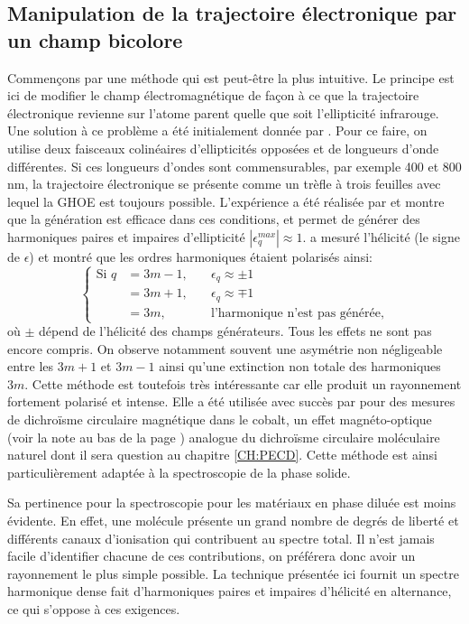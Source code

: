 \subsection{Manipulation de la trajectoire électronique par un champ bicolore}
Commençons par une méthode qui est peut-être la plus intuitive. Le principe est ici de modifier le champ électromagnétique de façon à ce que la trajectoire électronique revienne sur l'atome parent quelle que soit l'ellipticité infrarouge. Une solution à ce problème a été initialement donnée par . Pour ce faire, on utilise deux faisceaux colinéaires d’ellipticités opposées et de longueurs d'onde différentes. Si ces longueurs d'ondes sont commensurables, par exemple 400 et 800 nm, la trajectoire électronique se présente comme un trèfle à trois feuilles avec lequel la GHOE est toujours possible. L'expérience a été réalisée par  et montre que la génération est efficace dans ces conditions, et permet de générer des harmoniques paires et impaires d'ellipticité $|\epsilon^{max}_q|\approx 1$.  a mesuré l'hélicité (le signe de $\epsilon$) et montré que les ordres harmoniques étaient polarisés ainsi:
\begin{equation}
\left\{
\begin{aligned}
  \text{Si }q&=3m-1,\quad &\epsilon_q \approx \pm 1 \\
	&=3m+1, &\epsilon_q \approx \mp 1 \\
	&=3m, &\text{l'harmonique n'est pas générée},
\end{aligned}
\right.
\end{equation}
où $\pm$ dépend de l'hélicité des champs générateurs. Tous les effets ne sont pas encore compris. On observe notamment souvent une asymétrie non négligeable entre les $3m+1$ et $3m-1$ ainsi qu'une extinction non totale des harmoniques $3m$.
Cette méthode est toutefois très intéressante car elle produit un rayonnement fortement polarisé et intense. Elle a été utilisée avec succès par  pour des mesures de dichroïsme circulaire magnétique dans le cobalt, un effet magnéto-optique (voir la note au bas de la page \pageref{page:noteFaraday}) analogue du dichroïsme circulaire moléculaire naturel dont il sera question au chapitre \ref{CH:PECD}. Cette méthode est ainsi particulièrement adaptée à la spectroscopie de la phase solide.\par
Sa pertinence pour la spectroscopie pour les matériaux en phase diluée est moins évidente. En effet, une molécule présente un grand nombre de degrés de liberté et différents canaux d'ionisation qui contribuent au spectre total. Il n'est jamais facile d'identifier chacune de ces contributions, on préférera donc avoir un rayonnement le plus simple possible.
La technique présentée ici fournit un spectre harmonique dense fait d'harmoniques paires et impaires d'hélicité en alternance, ce qui s'oppose à ces exigences.

